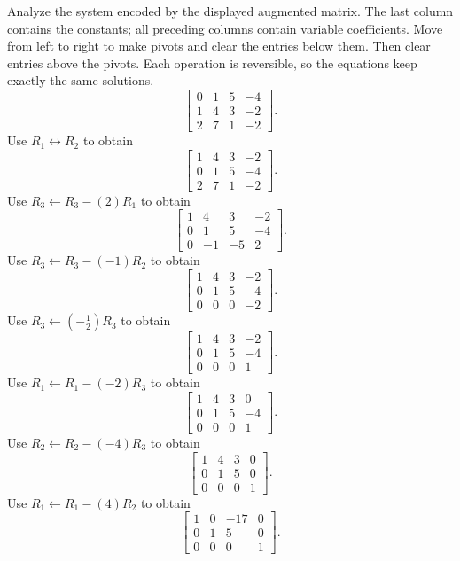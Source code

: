 \goal Analyze the system encoded by the displayed augmented matrix. The last column contains the constants; all preceding columns contain variable coefficients.
\idea Move from left to right to make pivots and clear the entries below them. Then clear entries above the pivots. Each operation is reversible, so the equations keep exactly the same solutions.
\[ \left[\begin{array}{rrr|r}0&1&5&-4\\1&4&3&-2\\2&7&1&-2\end{array}\right].\]
Use $R_{1}\leftrightarrow R_{2}$ to obtain
\[ \left[\begin{array}{rrr|r}1&4&3&-2\\0&1&5&-4\\2&7&1&-2\end{array}\right].\]
Use $R_{3}\leftarrow R_{3}-(2)R_{1}$ to obtain
\[ \left[\begin{array}{rrr|r}1&4&3&-2\\0&1&5&-4\\0&-1&-5&2\end{array}\right].\]
Use $R_{3}\leftarrow R_{3}-(-1)R_{2}$ to obtain
\[ \left[\begin{array}{rrr|r}1&4&3&-2\\0&1&5&-4\\0&0&0&-2\end{array}\right].\]
Use $R_{3}\leftarrow(- \frac{1}{2})R_{3}$ to obtain
\[ \left[\begin{array}{rrr|r}1&4&3&-2\\0&1&5&-4\\0&0&0&1\end{array}\right].\]
Use $R_{1}\leftarrow R_{1}-(-2)R_{3}$ to obtain
\[ \left[\begin{array}{rrr|r}1&4&3&0\\0&1&5&-4\\0&0&0&1\end{array}\right].\]
Use $R_{2}\leftarrow R_{2}-(-4)R_{3}$ to obtain
\[ \left[\begin{array}{rrr|r}1&4&3&0\\0&1&5&0\\0&0&0&1\end{array}\right].\]
Use $R_{1}\leftarrow R_{1}-(4)R_{2}$ to obtain
\[ \left[\begin{array}{rrr|r}1&0&-17&0\\0&1&5&0\\0&0&0&1\end{array}\right].\]

